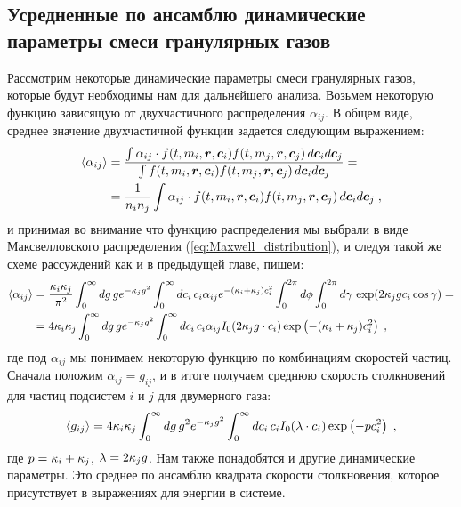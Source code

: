 \subsection{Усредненные по ансамблю динамические параметры смеси гранулярных газов}
Рассмотрим некоторые динамические параметры смеси гранулярных газов, которые будут необходимы нам для дальнейшего анализа.
Возьмем некоторую функцию зависящую от двухчастичного распределения $\alpha_{ij}$. В общем виде, среднее значение
двухчастичной функции задается следующим выражением:
\begin{equation}
  \begin{split}
    \langle \alpha_{ij}\rangle &= \frac{\int \alpha_{ij}\cdot f(t,m_i,\bm{r},\bm{c}_i)f(t,m_j,\bm{r},\bm{c}_j)\,d\bm{c}_id\bm{c}_j}
    {\int f(t,m_i,\bm{r},\bm{c}_i)f(t,m_j,\bm{r},\bm{c}_j)\,d\bm{c}_id\bm{c}_j} = \\
    &= \frac{1}{n_in_j}\int \alpha_{ij}\cdot f(t,m_i,\bm{r},\bm{c}_i)f(t,m_j,\bm{r},\bm{c}_j)\,d\bm{c}_id\bm{c}_j\;,
  \end{split}
\end{equation}
и принимая во внимание что функцию распределения мы выбрали в виде Максвелловского распределения (\ref{eq:Maxwell_distribution}), и 
следуя такой же схеме рассуждений как и в предыдущей главе, пишем:
\begin{equation}
  \begin{split}
    \langle \alpha_{ij}\rangle &= \frac{\kappa_i\kappa_j}{\pi^2}\int_{0}^{\infty}dg\,ge^{-\kappa_jg^2}\int_{0}^{\infty}dc_i\,c_i\alpha_{ij}e^{-(\kappa_i+\kappa_j)c^2_i}
    \int_{0}^{2\pi}d\phi\int_{0}^{2\pi}d\gamma\,\exp(2\kappa_jgc_i\cos\gamma)=\\
    &=4\kappa_i\kappa_j\int_{0}^{\infty}dg\,ge^{-\kappa_jg^2}\int_{0}^{\infty}dc_i\,c_i\alpha_{ij}I_0(2\kappa_jg\cdot c_i)
    \exp\left(-(\kappa_i+\kappa_j)c^2_i\right)\;,
  \end{split}
\end{equation}
где под $\alpha_{ij}$ мы понимаем некоторую функцию по комбинациям скоростей частиц. Сначала положим $\alpha_{ij}=g_{ij}$, 
и в итоге получаем среднюю скорость столкновений для частиц подсистем $i$ и $j$ для двумерного газа:
\begin{equation}
    \langle g_{ij}\rangle = 4\kappa_i\kappa_j\int_{0}^{\infty}dg\,g^2e^{-\kappa_jg^2}\int_{0}^{\infty}dc_i\,c_i
    I_0(\lambda\cdot c_i)\exp\left(-pc^2_i\right)\;,
\end{equation}
где $p=\kappa_i+\kappa_j$, $\lambda = 2\kappa_j g$. Нам также понадобятся и другие динамические параметры. Это среднее по ансамблю
квадрата скорости столкновения, которое присутствует в выражениях для энергии в системе.
